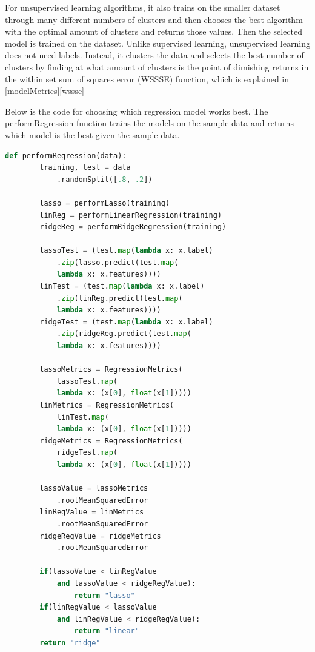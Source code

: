\documentclass[9pt,twocolumn,twoside]{idsi}
\begin{document}
For unsupervised learning algorithms, it also trains on the smaller dataset through many different numbers of clusters and then chooses the best algorithm with the optimal amount of clusters and returns those values. Then the selected model is trained on the dataset. Unlike supervised learning, unsupervised learning does not need labels. Instead, it clusters the data and selects the best number of clusters by finding at what amount of clusters is the point of dimishing returns in the within set sum of squares error (WSSSE) function, which is explained in \ref{modelMetrics}\ref{wssse}

Below is the code for choosing which regression model works best. The performRegression function trains the models on the sample data and returns which model is the best given the sample data. 


\begin{lstlisting}[language=Python]
def performRegression(data):
        training, test = data
        	.randomSplit([.8, .2])
            
        lasso = performLasso(training)
        linReg = performLinearRegression(training)
        ridgeReg = performRidgeRegression(training)

        lassoTest = (test.map(lambda x: x.label)
        	.zip(lasso.predict(test.map(
            lambda x: x.features))))
        linTest = (test.map(lambda x: x.label)
        	.zip(linReg.predict(test.map(
            lambda x: x.features))))
        ridgeTest = (test.map(lambda x: x.label)
        	.zip(ridgeReg.predict(test.map(
            lambda x: x.features))))

        lassoMetrics = RegressionMetrics(
        	lassoTest.map(
            lambda x: (x[0], float(x[1]))))
        linMetrics = RegressionMetrics(
        	linTest.map(
            lambda x: (x[0], float(x[1]))))
        ridgeMetrics = RegressionMetrics(
        	ridgeTest.map(
            lambda x: (x[0], float(x[1]))))

        lassoValue = lassoMetrics
        	.rootMeanSquaredError
        linRegValue = linMetrics
        	.rootMeanSquaredError
        ridgeRegValue = ridgeMetrics
        	.rootMeanSquaredError

        if(lassoValue < linRegValue 
        	and lassoValue < ridgeRegValue):
                return "lasso"
        if(linRegValue < lassoValue 
        	and linRegValue < ridgeRegValue):
                return "linear"
        return "ridge"
\end{lstlisting}
\end{document}
